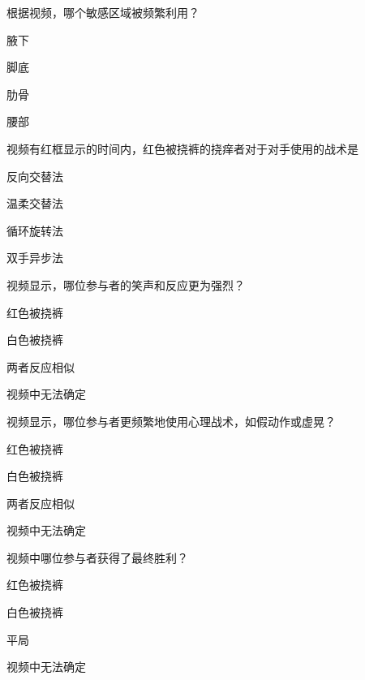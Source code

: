 \documentclass{exam-zh}
\begin{document}
\begin{question}[points = 2]
  根据视频，哪个敏感区域被频繁利用？



  \begin{choices}
    \item 腋下
    \item 脚底
    \item 肋骨
    \item 腰部
  \end{choices}
\end{question}

\begin{question}[points = 2]
  视频有红框显示的时间内，红色被挠裤的挠痒者对于对手使用的战术是



  \begin{choices}
    \item 反向交替法
    \item 温柔交替法
    \item 循环旋转法
    \item 双手异步法
  \end{choices}
\end{question}

\begin{question}[points = 2]
  视频显示，哪位参与者的笑声和反应更为强烈？



  \begin{choices}
    \item 红色被挠裤
    \item 白色被挠裤
    \item 两者反应相似
    \item 视频中无法确定
  \end{choices}
\end{question}

\begin{question}[points = 2]
  视频显示，哪位参与者更频繁地使用心理战术，如假动作或虚晃？  


  \begin{choices}
    \item 红色被挠裤
    \item 白色被挠裤
    \item 两者反应相似
    \item 视频中无法确定
  \end{choices}
\end{question}

\begin{question}[points = 2]
  视频中哪位参与者获得了最终胜利？



  \begin{choices}
    \item 红色被挠裤
    \item 白色被挠裤
    \item 平局
    \item 视频中无法确定
  \end{choices}
\end{question}
\end{document}

